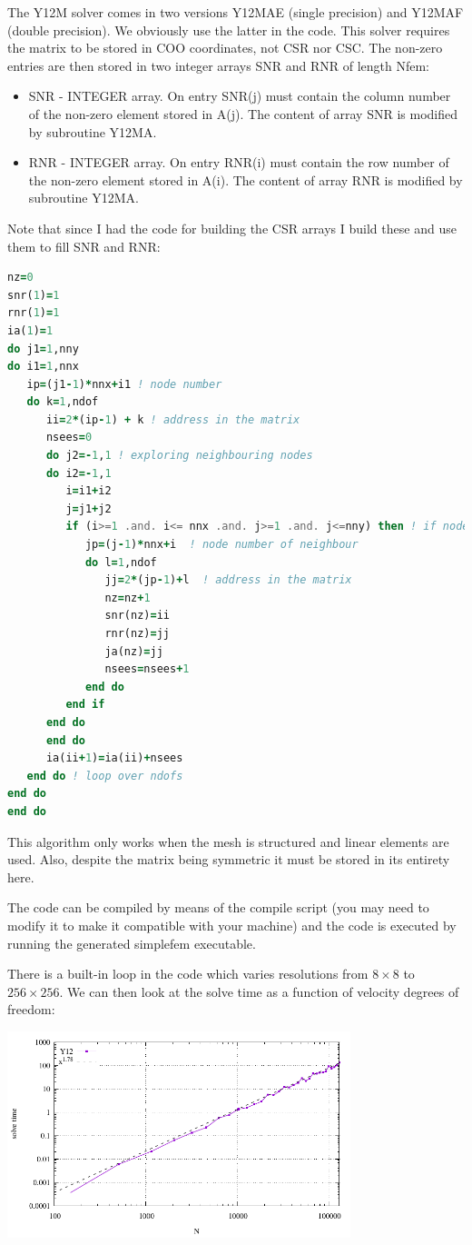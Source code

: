 The Y12M solver comes in two versions Y12MAE (single precision) and Y12MAF (double precision).
We obviously use the latter in the code. 
This solver requires the matrix to be stored in COO coordinates, not CSR nor CSC.
The non-zero entries are then stored in two integer arrays SNR and RNR of length Nfem:
\begin{itemize}
\item SNR - INTEGER array. On entry SNR(j) must contain the
column number of the non-zero element stored in A(j).
The content of array SNR is modified by
subroutine Y12MA. 
\item RNR - INTEGER array. On entry RNR(i) must contain the row
number of the non-zero element stored in A(i).
The content of array RNR is modified by subroutine Y12MA.
\end{itemize}
Note that since I had the code for building the CSR arrays I build these and use them to fill SNR and RNR:
\begin{lstlisting}[language=Fortran]
nz=0
snr(1)=1
rnr(1)=1
ia(1)=1
do j1=1,nny
do i1=1,nnx
   ip=(j1-1)*nnx+i1 ! node number
   do k=1,ndof
      ii=2*(ip-1) + k ! address in the matrix
      nsees=0
      do j2=-1,1 ! exploring neighbouring nodes
      do i2=-1,1
         i=i1+i2
         j=j1+j2
         if (i>=1 .and. i<= nnx .and. j>=1 .and. j<=nny) then ! if node exists
            jp=(j-1)*nnx+i  ! node number of neighbour 
            do l=1,ndof
               jj=2*(jp-1)+l  ! address in the matrix
               nz=nz+1
               snr(nz)=ii
               rnr(nz)=jj
               ja(nz)=jj
               nsees=nsees+1
            end do
         end if
      end do
      end do
      ia(ii+1)=ia(ii)+nsees
   end do ! loop over ndofs
end do
end do
\end{lstlisting}
This algorithm only works when the mesh is structured and linear elements are used. Also, 
despite the matrix being symmetric it must be stored in its entirety here. 

The code can be compiled by means of the {\filenamefont compile} script (you may need to 
modify it to make it compatible with your machine) and the code is executed by running
the generated {\filenamefont simplefem} executable.  

There is a built-in loop in the code which varies resolutions from $8\times 8$ to $256\times 256$.
We can then look at the solve time as a function of velocity degrees of freedom: 

\begin{center}
\includegraphics[width=10cm]{python_codes/fieldstone_101/results/timings.pdf}
\end{center}

